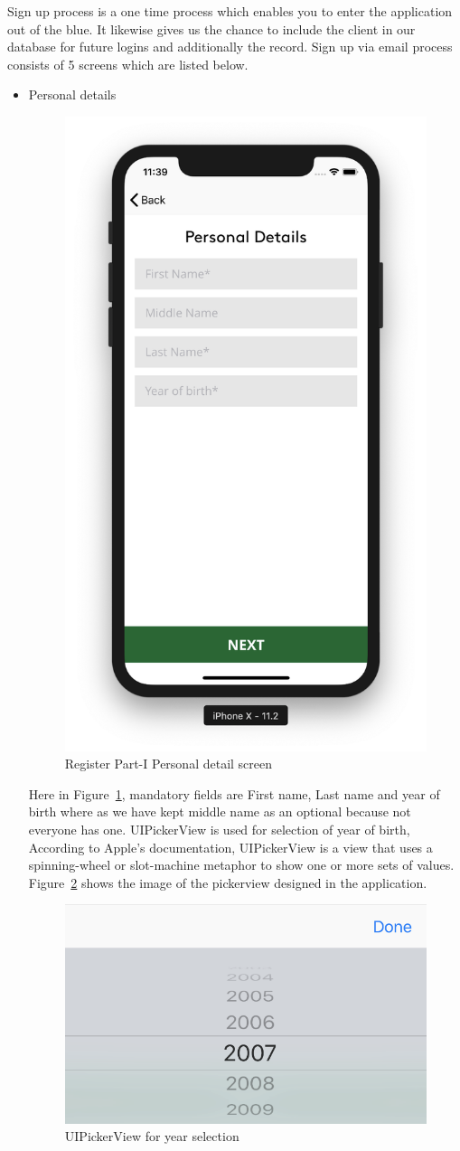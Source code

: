 Sign up process is a one time process which enables you to enter the application out of the blue. It likewise gives us the chance to include the client in our database for future logins and additionally the record. Sign up via email process consists of 5 screens which are listed below.

\begin{itemize}

    \item Personal details
    
    \begin{figure}[H]
            \centering
            \includegraphics[width=0.25\linewidth]{figures/ch4/register_personal.png}
            \caption{\label{fig:register_personal_ch4} Register Part-I Personal detail screen}
    \end{figure}
    
    Here in Figure~\ref{fig:register_personal_ch4}, mandatory fields are First name, Last name and year of birth where as we have kept middle name as an optional because not everyone has one. UIPickerView is used for selection of year of birth, According to Apple's documentation, UIPickerView is a view that uses a spinning-wheel or slot-machine metaphor to show one or more sets of values. Figure~\ref{fig:pickerview} shows the image of the pickerview designed in the application.
    
    \begin{figure}[H]
            \centering
            \includegraphics[width=0.25\linewidth]{figures/ch4/pickerview.png}
            \caption{\label{fig:pickerview} UIPickerView for year selection}
    \end{figure}
    

\end{itemize}
